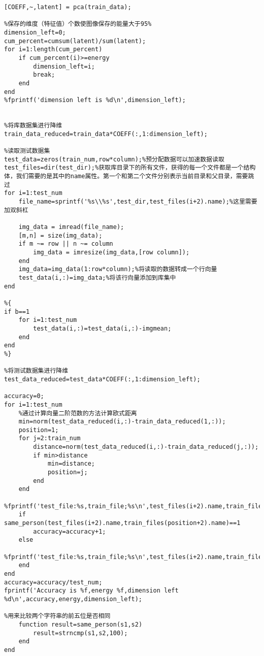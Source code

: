 \documentclass[12pt]{article}
\begin{document}
\begin{lstlisting}
[COEFF,~,latent] = pca(train_data);

%保存的维度（特征值）个数使图像保存的能量大于95%
dimension_left=0;
cum_percent=cumsum(latent)/sum(latent);
for i=1:length(cum_percent)
    if cum_percent(i)>=energy
        dimension_left=i;
        break;
    end
end
%fprintf('dimension left is %d\n',dimension_left);


%将库数据集进行降维
train_data_reduced=train_data*COEFF(:,1:dimension_left);

%读取测试数据集
test_data=zeros(train_num,row*column);%预分配数据可以加速数据读取
test_files=dir(test_dir);%获取库目录下的所有文件，获得的每一个文件都是一个结构体，我们需要的是其中的name属性。第一个和第二个文件分别表示当前目录和父目录，需要跳过
for i=1:test_num
    file_name=sprintf('%s\\%s',test_dir,test_files(i+2).name);%这里需要加双斜杠
    
    img_data = imread(file_name);
    [m,n] = size(img_data);
    if m ~= row || n ~= column
        img_data = imresize(img_data,[row column]);
    end
    img_data=img_data(1:row*column);%将读取的数据转成一个行向量
    test_data(i,:)=img_data;%将该行向量添加到库集中
end

%{
if b==1
    for i=1:test_num
        test_data(i,:)=test_data(i,:)-imgmean;
    end
end
%}

%将测试数据集进行降维
test_data_reduced=test_data*COEFF(:,1:dimension_left);

accuracy=0;
for i=1:test_num
    %通过计算向量二阶范数的方法计算欧式距离
    min=norm(test_data_reduced(i,:)-train_data_reduced(1,:));
    position=1;
    for j=2:train_num
        distance=norm(test_data_reduced(i,:)-train_data_reduced(j,:));
        if min>distance
            min=distance;
            position=j;
        end
    end
    %fprintf('test_file:%s,train_file;%s\n',test_files(i+2).name,train_files(position+2).name);
    if same_person(test_files(i+2).name,train_files(position+2).name)==1
        accuracy=accuracy+1;
    else
        %fprintf('test_file:%s,train_file;%s\n',test_files(i+2).name,train_files(position+2).name);
    end
end
accuracy=accuracy/test_num;
fprintf('Accuracy is %f,energy %f,dimension left %d\n',accuracy,energy,dimension_left);

%用来比较两个字符串的前五位是否相同
    function result=same_person(s1,s2)
        result=strncmp(s1,s2,100);
    end
end


    \end{lstlisting}
\end{document}

